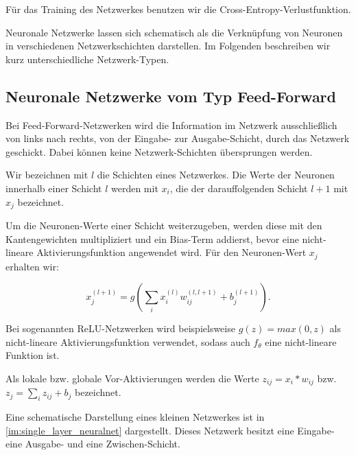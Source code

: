\documentclass[11pt,a4paper]{article}
\numberwithin{equation}{section}
\begin{document}
	Für das Training des Netzwerkes benutzen wir die Cross-Entropy-Verlustfunktion.
	
	Neuronale Netzwerke lassen sich schematisch als die Verknüpfung von Neuronen in verschiedenen Netzwerkschichten darstellen. Im Folgenden beschreiben wir kurz unterschiedliche Netzwerk-Typen.
	
	\subsection{Neuronale Netzwerke vom Typ Feed-Forward}
	
	Bei Feed-Forward-Netzwerken wird die Information im Netzwerk ausschließlich von links nach rechts, von der Eingabe- zur Ausgabe-Schicht, durch das Netzwerk geschickt. Dabei können keine Netzwerk-Schichten übersprungen werden.
	
	Wir bezeichnen mit $l$ die Schichten eines Netzwerkes. Die Werte der Neuronen innerhalb einer Schicht $l$ werden mit $x_i$, die der darauffolgenden Schicht $l+1$ mit $x_j$ bezeichnet.
	
	Um die Neuronen-Werte einer Schicht weiterzugeben, werden diese mit den Kantengewichten multipliziert und ein Bias-Term addierst, bevor eine nicht-lineare Aktivierungsfunktion angewendet wird. Für den Neuronen-Wert $x_j$ erhalten wir:
	
	\begin{equation}
		x_j^{(l+1)} = g(\sum_i{x_i^{(l)}w_{ij}^{(l,l+1)} + b_j^{(l+1)}}).
	\end{equation}
	
	Bei sogenannten ReLU-Netzwerken wird beispielsweise $g(z) = max(0,z)$ als nicht-lineare Aktivierungsfunktion verwendet, sodass auch $f_\theta$ eine nicht-lineare Funktion ist.
	
	Als lokale bzw. globale Vor-Aktivierungen werden die Werte $z_{ij} = x_i*w_{ij}$ bzw. $z_j = \sum_iz_{ij} + b_j$ bezeichnet.
	
	Eine schematische Darstellung eines kleinen Netzwerkes ist in \autoref{im:single_layer_neuralnet} dargestellt. Dieses Netzwerk  besitzt eine Eingabe- eine Ausgabe- und eine Zwischen-Schicht.
	
\end{document}
